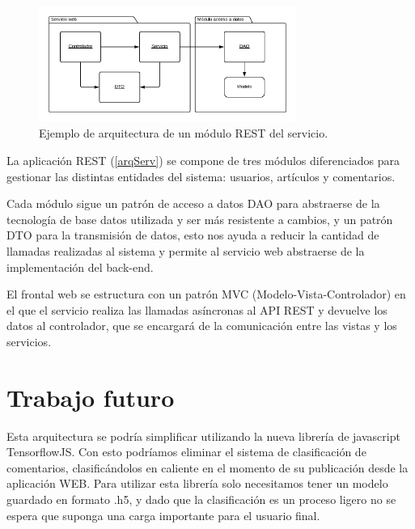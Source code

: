 \begin{figure}[H]
	\centering
	\includegraphics[width=0.75\textwidth]{imaxes/restmodel.png}
	\caption{Ejemplo de arquitectura de un módulo REST del servicio.}
	\label{restModel}
\end{figure}

La aplicación REST (\ref{arqServ}) se compone de tres módulos diferenciados para gestionar las distintas entidades del sistema: usuarios, artículos y comentarios.

Cada módulo sigue un patrón de acceso a datos DAO para abstraerse de la tecnología de base datos utilizada y ser más resistente a cambios, y un patrón DTO para la transmisión de datos, esto nos ayuda a reducir la cantidad de llamadas realizadas al sistema y permite al servicio web abstraerse de la implementación del back-end.

El frontal web se estructura con un patrón MVC (Modelo-Vista-Controlador) en el que el servicio realiza las llamadas asíncronas al API REST y devuelve los datos al controlador, que se encargará de la comunicación entre las vistas y los servicios.

\section{Trabajo futuro} Esta arquitectura se podría simplificar utilizando la nueva librería de javascript TensorflowJS. Con esto podríamos eliminar el sistema de clasificación de comentarios, clasificándolos en caliente en el momento de su publicación desde la aplicación WEB. 
Para utilizar esta librería solo necesitamos tener un modelo guardado en formato .h5, y dado que la clasificación es un proceso ligero no se espera que suponga una carga importante para el usuario final.
